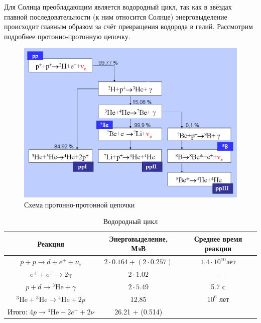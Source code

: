 \documentclass[a4paper,12pt]{article}
\begin{document}
Для Солнца преобладающим является водородный цикл, так как в звёздах главной последовательности (к ним относится Солнце) энерговыделение происходит главным образом за счёт превращения водорода в гелий. Рассмотрим подробнее протонно-протонную цепочку.

\begin{figure}[H]
		\centering
		\includegraphics[width=150mm]{Images/Proton_proton_cycle.png}
        \caption{Схема протонно-протонной цепочки}
\end{figure}

\begin{table}[H]
    \centering
    \renewcommand{\arraystretch}{1.5} %
    \begin{tabular}{|c|c|c|} 
        \hline
        Реакция & Энерговыделение, МэВ & Среднее время реакции \\ \hline
        $p + p \rightarrow d + e^+ + \nu_e$ & $2 \cdot 0.164 + (2 \cdot 0.257)$ & $1.4 \cdot 10^{10} \text{лет}$ \\ \hline
        $e^+ + e^- \rightarrow 2\gamma$ & $2 \cdot 1.02 $ & --- \\ \hline
        $p + d \rightarrow \mathrm{{}^{3}He} + \gamma$ & $2 \cdot 5.49$ & 5.7 с \\ \hline
        $\mathrm{{}^{3}He} + \mathrm{{}^{3}He} \rightarrow \mathrm{{}^{4}He} + 2p$ & 12.85 & $10^6$ лет \\ \hline
        $\text{Итого: } 4p \rightarrow \mathrm{{}^{4}He} + 2e^+ + 2\nu$  & 26.21 + (0.514) &  \\ \hline
    \end{tabular}
    \caption{Водородный цикл}
\end{table}
\end{document}
